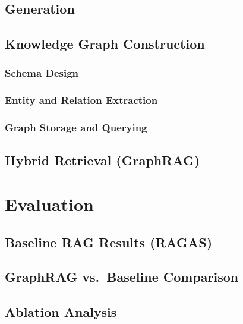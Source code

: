 \documentclass[
  english,
  12pt,
]{report}
\begin{document}
\section{Generation}\label{generation}

\section{Knowledge Graph
Construction}\label{knowledge-graph-construction}

\subsection{Schema Design}\label{schema-design}

\subsection{Entity and Relation
Extraction}\label{entity-and-relation-extraction}

\subsection{Graph Storage and
Querying}\label{graph-storage-and-querying}

\section{Hybrid Retrieval (GraphRAG)}\label{hybrid-retrieval-graphrag}

\newpage

\chapter{Evaluation}\label{evaluation}

\section{Baseline RAG Results (RAGAS)}\label{baseline-rag-results-ragas}

\section{GraphRAG vs.~Baseline
Comparison}\label{graphrag-vs.-baseline-comparison}

\section{Ablation Analysis}\label{ablation-analysis}
\end{document}
